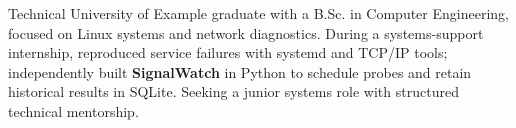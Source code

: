 
\begin{cvparagraph}
Technical University of Example graduate with a B.Sc. in Computer Engineering, focused on Linux systems and network diagnostics. During a systems-support internship, reproduced service failures with systemd and TCP/IP tools; independently built \textbf{SignalWatch} in Python to schedule probes and retain historical results in SQLite. Seeking a junior systems role with structured technical mentorship.
\end{cvparagraph}

